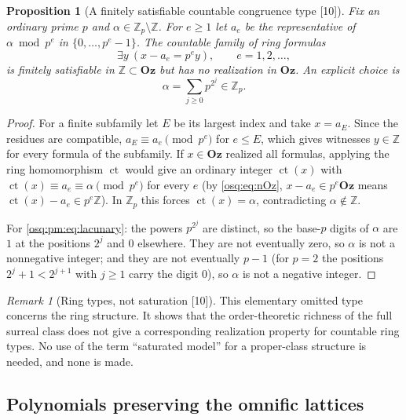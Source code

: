 \documentclass[11pt,letterpaper]{article}
\numberwithin{equation}{section}
\newtheorem{proposition}[proposition]{Proposition}
\theoremstyle{definition}
\theoremstyle{remark}
\newtheorem{remark}[remark]{Remark}
\theoremstyle{plain}
\newcommand{\Oz}{\mathbf{Oz}}
\newcommand{\Z}{\mathbb Z}
\newcommand{\ct}{\operatorname{ct}}
\newcommand{\src}[1]{\textup{\textsf{[#1]}}}
\begin{document}
\begin{proposition}[A finitely satisfiable countable congruence type \src{10}]
\label{osq:pm:prop:type}
Fix an ordinary prime $p$ and $\alpha\in\Z_p\setminus\Z$. For $e\ge1$ let $a_e$ be the
representative of $\alpha\bmod p^e$ in $\{0,\dots,p^e-1\}$. The countable family of ring
formulas
\begin{equation}\label{osq:pm:eq:type}
 \exists y\ (x-a_e=p^e y),\qquad e=1,2,\dots,
\end{equation}
is finitely satisfiable in $\Z\subset\Oz$ but has no realization in $\Oz$. An explicit
choice is
\begin{equation}\label{osq:pm:eq:lacunary}
 \alpha=\sum_{j\ge0}p^{2^j}\in\Z_p .
\end{equation}
\end{proposition}
\begin{proof}
For a finite subfamily let $E$ be its largest index and take $x=a_E$. Since the residues
are compatible, $a_E\equiv a_e\pmod{p^e}$ for $e\le E$, which gives witnesses $y\in\Z$ for
every formula of the subfamily. If $x\in\Oz$ realized all formulas, applying the ring
homomorphism $\ct$ would give an ordinary integer $\ct(x)$ with
$\ct(x)\equiv a_e\equiv\alpha\pmod{p^e}$ for every $e$ (by \eqref{osq:eq:nOz},
$x-a_e\in p^e\Oz$ means $\ct(x)-a_e\in p^e\Z$). In $\Z_p$ this forces
$\ct(x)=\alpha$, contradicting $\alpha\notin\Z$.

For \eqref{osq:pm:eq:lacunary}: the powers $p^{2^j}$ are distinct, so the base-$p$ digits
of $\alpha$ are $1$ at the positions $2^j$ and $0$ elsewhere. They are not eventually
zero, so $\alpha$ is not a nonnegative integer; and they are not eventually $p-1$ (for
$p=2$ the positions $2^j+1<2^{j+1}$ with $j\ge1$ carry the digit $0$), so $\alpha$ is not a
negative integer.
\end{proof}

\begin{remark}[Ring types, not saturation \src{10}]\label{osq:pm:rem:saturation}
This elementary omitted type concerns the ring structure. It shows that the
order-theoretic richness of the full surreal class does not give a corresponding
realization property for countable ring types. No use of the term ``saturated model'' for
a proper-class structure is needed, and none is made.
\end{remark}

\subsection{Polynomials preserving the omnific lattices}\label{osq:pm:sub:numerical}
\end{document}
